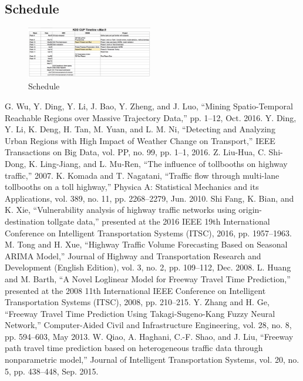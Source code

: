 \documentclass[journal, letterpaper]{IEEEtran}
\begin{document}
\subsection{Schedule}

\begin{figure} [H]
  \centering
  \includegraphics[width=0.49\textwidth]{KDDCUP-Schedule.jpg}
  \caption{Schedule}
  \label{fig:14}
\end{figure}

\begin{thebibliography}{99}
{}G. Wu, Y. Ding, Y. Li, J. Bao, Y. Zheng, and J. Luo, “Mining Spatio-Temporal Reachable Regions over Massive Trajectory Data,” pp. 1–12, Oct. 2016.
Y. Ding, Y. Li, K. Deng, H. Tan, M. Yuan, and L. M. Ni, “Detecting and Analyzing Urban Regions with High Impact of Weather Change on Transport,” IEEE Transactions on Big Data, vol. PP, no. 99, pp. 1–1, 2016.
Z. Liu-Hua, C. Shi-Dong, K. Ling-Jiang, and L. Mu-Ren, “The influence of tollbooths on highway traffic,” 2007.
K. Komada and T. Nagatani, “Traffic flow through multi-lane tollbooths on a toll highway,” Physica A: Statistical Mechanics and its Applications, vol. 389, no. 11, pp. 2268–2279, Jun. 2010.
Shi Fang, K. Bian, and K. Xie, “Vulnerability analysis of highway traffic networks using origin-destination tollgate data,” presented at the 2016 IEEE 19th International Conference on Intelligent Transportation Systems (ITSC), 2016, pp. 1957–1963.
M. Tong and H. Xue, “Highway Traffic Volume Forecasting Based on Seasonal ARIMA Model,” Journal of Highway and Transportation Research and Development (English Edition), vol. 3, no. 2, pp. 109–112, Dec. 2008.
L. Huang and M. Barth, “A Novel Loglinear Model for Freeway Travel Time Prediction,” presented at the 2008 11th International IEEE Conference on Intelligent Transportation Systems (ITSC), 2008, pp. 210–215.
Y. Zhang and H. Ge, “Freeway Travel Time Prediction Using Takagi-Sugeno-Kang Fuzzy Neural Network,” Computer-Aided Civil and Infrastructure Engineering, vol. 28, no. 8, pp. 594–603, May 2013.
W. Qiao, A. Haghani, C.-F. Shao, and J. Liu, “Freeway path travel time prediction based on heterogeneous traffic data through nonparametric model,” Journal of Intelligent Transportation Systems, vol. 20, no. 5, pp. 438–448, Sep. 2015.

\end{thebibliography}
\end{document}
